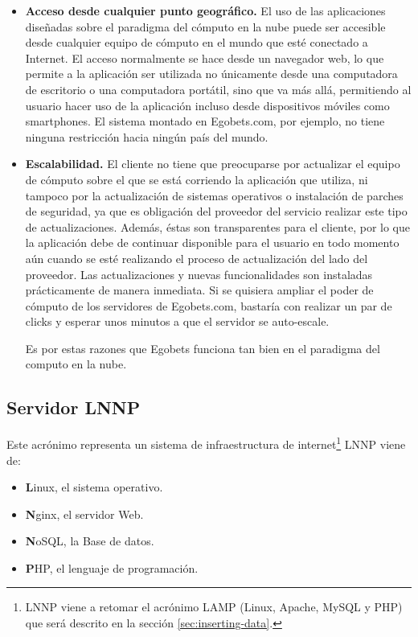 \begin{itemize}
	\item \textbf{Acceso desde cualquier punto geográfico.} El uso de las aplicaciones diseñadas sobre el paradigma del cómputo en la nube puede ser accesible desde cualquier equipo de cómputo en el mundo que esté conectado a Internet. El acceso normalmente se hace desde un navegador web, lo que permite a la aplicación ser utilizada no únicamente desde una computadora de escritorio o una computadora portátil, sino que va más allá, permitiendo al usuario hacer uso de la aplicación incluso desde dispositivos móviles como smartphones. El sistema montado en Egobets.com, por ejemplo, no tiene ninguna restricción hacia ningún país del mundo.

	\item \textbf{Escalabilidad.} El cliente no tiene que preocuparse por actualizar el equipo de cómputo sobre el que se está corriendo la aplicación que utiliza, ni tampoco por la actualización de sistemas operativos o instalación de parches de seguridad, ya que es obligación del proveedor del servicio realizar este tipo de actualizaciones. Además, éstas son transparentes para el cliente, por lo que la aplicación debe de continuar disponible para el usuario en todo momento aún cuando se esté realizando el proceso de actualización del lado del proveedor. Las actualizaciones y nuevas funcionalidades son instaladas prácticamente de manera inmediata. Si se quisiera ampliar el poder de cómputo de los servidores de Egobets.com, bastaría con realizar un par de clicks y esperar unos minutos a que el servidor se auto-escale.

Es por estas razones que Egobets funciona tan bien en el paradigma del computo en la nube.

\end{itemize}

\subsection{Servidor LNNP}

Este acrónimo representa un sistema de infraestructura de internet\footnote{LNNP viene a retomar el acrónimo LAMP (Linux, Apache, MySQL y PHP) que será descrito en la sección \ref{sec:inserting-data}.} LNNP viene de:
\begin{itemize}
	\item \textbf{L}inux, el sistema operativo.
	\item \textbf{N}ginx, el servidor Web.
	\item \textbf{N}oSQL, la Base de datos.
	\item \textbf{P}HP, el lenguaje de programación.
\end{itemize}

